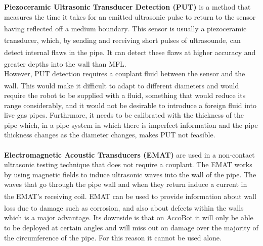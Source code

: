 \documentclass[11pt]{article}		%
\newcommand{\supercite}[1]{\textsuperscript{\cite{#1}}}		%
\begin{document}
	        \textbf{Piezoceramic Ultrasonic Transducer Detection (PUT)} is a method that measures the time it takes for an emitted ultrasonic pulse to return to the sensor having reflected off a medium boundary\supercite{UT_explanation}. This sensor is usually a piezoceramic transducer\supercite{UT}, which, by sending and receiving short pulses of ultrasounde, can detect internal flaws in the pipe\supercite{Corrosion}. It can detect these flaws at higher accuracy and greater depths into the wall than MFL\supercite{MFL_Pig}.
	        \\
            \hspace*{2ex}However, PUT detection requires a couplant fluid between the sensor and the wall\supercite{UT_explanation}. This would make it difficult to adapt to different diameters and would require the robot to be supplied with a fluid, something that would reduce its range considerably, and it would not be desirable to introduce a foreign fluid into live gas pipes. Furthrmore, it needs to be calibrated with the thickness of the pipe which, in a pipe system in which there is imperfect information and the pipe thickness changes as the diameter changes, makes PUT not feasible.
	       \\\hspace*{2ex}
	        \\\hspace*{2ex}
	        \textbf{Electromagnetic Acoustic Transducers (EMAT)} are used in a non-contact ultrasonic testing technique that does not require a couplant. The EMAT works by using magnetic fields to induce ultrasonic waves into the wall of the pipe. The waves that go through the pipe wall and when they return induce a current in the EMAT’s receiving coil\supercite{EMAT}. EMAT can be used to provide information about wall loss due to damage such as corrosion\supercite{EMAT}, and also about defects within the walls which is a major advantage. Its downside is that on AccoBot it will only be able to be deployed at certain angles and will miss out on damage over the majority of the circumference of the pipe. For this reason it cannot be used alone.
\end{document}

